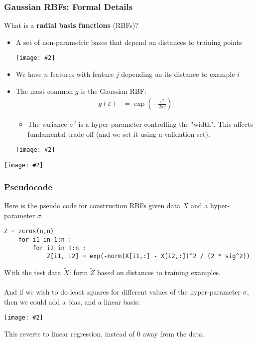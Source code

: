 \documentclass{article}
\def\blu#1{{\color{blu}#1}}
\def\gre#1{{\color{gre}#1}}
\newcommand{\centerfig}[2]{\begin{center}\texttt{[image: \#2]}\end{center}}
\begin{document}
\subsubsection*{Gaussian RBFs: Formal Details}
What is a \blu{\textbf{radial basis functions}} (RBFs)?
\begin{itemize}[label=-]
	\item A set of non-parametric bases that \gre{depend on distances to training points}
	\centerfig{1}{gauss-2}
	\item We have $ n $ features with \gre{feature $ j $ depending on its distance to example $ i $}
	\item The most common $ g $ is the Gaussian RBF:
	\begin{align*}
	g(\varepsilon) &= \exp (- \frac{\varepsilon^2}{2 \sigma ^2})
	\end{align*}
	\begin{itemize}
		\item The variance $ \sigma^2 $ is a hyper-parameter controlling the "width". This affects fundamental trade-off (and we set it using a validation set).
	\end{itemize}
\centerfig{0.3}{gauss-3}
\end{itemize} 
\centerfig{1}{gauss-4}

\subsubsection*{Pseudocode}
Here is the pseudo code for construction RBFs given data $ X $ and a hyper-parameter $ \sigma $
\begin{lstlisting}[tabsize=3]
	Z = zcros(n,n)
	for i1 in 1:n :
		for i2 in 1:n :
			Z[i1, i2] = exp(-norm(X[i1,:] - X[i2,:])^2 / (2 * sig^2))
\end{lstlisting}
With the test data $ \tilde{X}$: form $ \tilde{Z} $ based on distances to training examples. \\
\\
And if we wish to do least squares for different values of the hyper-parameter $ \sigma $, then we could add a bias, and a linear basis:
\centerfig{0.6}{bias-lin-basis}
This reverts to linear regression, instead of 0 away from the data.
\end{document}
